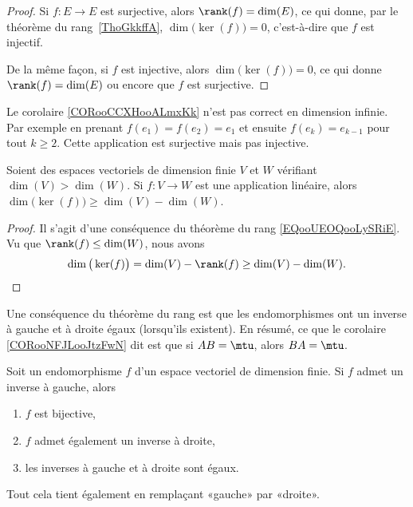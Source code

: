 \begin{proof}
	Si \( f\colon E\to E\) est surjective, alors \( \rank(f)=\dim(E)\), ce qui donne, par le théorème du rang~\ref{ThoGkkffA}, \( \dim\big( \ker(f) \big)=0\), c'est-à-dire que \( f\) est injectif.

	De la même façon, si \( f\) est injective, alors \( \dim\big( \ker(f) \big)=0\), ce qui donne \( \rank(f)=\dim(E)\) ou encore que \( f\) est surjective.
\end{proof}

\begin{example}
	Le corolaire \ref{CORooCCXHooALmxKk} n'est pas correct en dimension infinie. Par exemple en prenant \( f(e_1)=f(e_2)=e_1\) et ensuite \( f(e_k)=e_{k-1}\) pour tout \( k\geq 2\). Cette application est surjective mais pas injective.
\end{example}

\begin{proposition}	\label{PROPooKUAVooCbjDcR}
	Soient des espaces vectoriels de dimension finie \( V\) et \( W\) vérifiant \( \dim(V)>\dim(W)\). Si \(f \colon V\to W  \) est une application linéaire, alors \( \dim\big( \ker(f) \big)\geq \dim(V)-\dim(W)\).
\end{proposition}

\begin{proof}
	Il s'agit d'une conséquence du théorème du rang \eqref{EQooUEOQooLySRiE}. Vu que \( \rank(f)\leq \dim(W)\), nous avons
	\begin{equation}
		\dim\big( \ker(f) \big)=\dim(V)-\rank(f)\geq \dim(V)-\dim(W).
	\end{equation}
\end{proof}


Une conséquence du théorème du rang est que les endomorphismes ont un inverse à gauche et à droite égaux (lorsqu'ils existent). En résumé, ce que le corolaire \ref{CORooNFJLooJtzFwN} dit est que si \( AB=\mtu\), alors \( BA=\mtu\).
\begin{corollary}           \label{CORooNFJLooJtzFwN}
	Soit un endomorphisme \( f\) d'un espace vectoriel de dimension finie. Si \( f\) admet un inverse à gauche, alors
	\begin{enumerate}
		\item
		      \( f\) est bijective,
		\item
		      \( f\) admet également un inverse à droite,
		\item
		      les inverses à gauche et à droite sont égaux.
	\end{enumerate}
	Tout cela tient également en remplaçant «gauche» par «droite».
\end{corollary}

